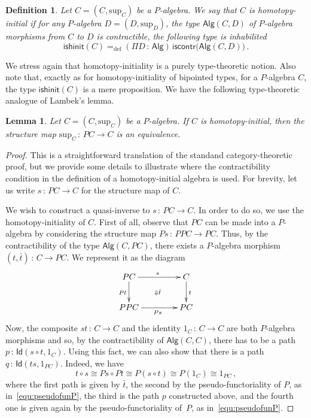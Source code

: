 \documentclass[10pt,a4paper,oneside,reqno]{amsart}
\numberwithin{equation}{section}
\theoremstyle{mythm}
\newtheorem{lemma}[theorem]{Lemma}
\theoremstyle{mydef}
\newtheorem{definition}[theorem]{Definition}
\theoremstyle{myrmk}
\newcommand{\ie}{\text{i.e.\ }}
\newcommand{\defeq}{=_{\mathrm{def}}}
\newcommand{\co}{\,{:}\,}
\newcommand{\iso}{\cong}
\newcommand{\iscontr}{\mathsf{iscontr}}
\newcommand{\isalghinit}{\mathsf{ishinit}}
\newcommand{\Id}{\mathsf{Id}}
\newcommand{\Palg}{\mathsf{Alg}}
\renewcommand{\sup}{\mathrm{sup}}
\begin{document}
\begin{definition}\label{def:AlgInit}
Let $C = (C, \sup_C)$ be a $P$-algebra. We say that $C$ is  \emph{homotopy-initial}  if for any $P$-algebra 
$D = (D, \sup_D)$, the type $\Palg(C,D)$ of $P$-algebra morphisms from $C$ to $D$
is contractible, \ie the following type is inhabilited
\[
\isalghinit(C) \defeq
 (\Pi D \co \Palg)  \, \iscontr \big( \Palg(C,D) \big)  \, .
\]  
\end{definition}

We stress again that homotopy-initiality is a purely type-theoretic notion. Also note that, exactly as for 
homotopy-initiality of bipointed types, for a $P$-algebra $C$, the type
$\isalghinit(C)$ is a mere proposition. 
We have the following type-theoretic analogue of Lambek's lemma.


\begin{lemma}\label{lem:IntLambek} Let $C = (C, \sup_C)$ be a $P$-algebra. 
If $C$ is homotopy-initial, then the structure map $\sup_C \co PC \to C$ is an equivalence.
\end{lemma}


\begin{proof} This is a straightforward translation of the standand category-theoretic proof, but we provide
some details to illustrate where the contractibility condition in the definition of a homotopy-initial algebra is
used. For brevity, let us write $s \co PC \to C$ for the structure map of $C$. 

 We wish to construct a quasi-inverse to $s \co PC \to C$. In order to do so, we use the homotopy-initiality
of $C$. First of all, observe that $PC$ can be made into a $P$-algebra by considering the structure map 
$Ps \co PPC \to PC$. Thus, by the contractibility of the type $\Palg(C, PC)$, there exists a $P$-algebra
morphism $(t, \bar{t}) \co C \to PC$. We represent it as the diagram
\begin{equation*}
\xymatrix@C=1.5cm{
PC \ar[d]_{Pt} \ar[r]^{s} \ar@{}[dr]|{\Downarrow \bar{t}}& C \ar[d]^{t} \\
PPC \ar[r]_{Ps} & PC}
\end{equation*}
Now, the composite $s  t \co C \to C$ and the identity $1_C \co C \to C$ are both $P$-algebra
morphisms and so, by the contractibility of $\Palg(C,C)$, there has to be a path $p \co \Id(s\circ t ,1_C)$. 
Using this fact, we can also show that there is a path $q \co \Id(t  s, 1_{PC})$. Indeed, we have
\[
t \circ s  \iso Ps \circ Pt 
 \iso P(s \circ t) 
 \iso P(1_C) 
  \iso 1_{PC} \, ,
\]
where the first path is given by $\bar{t}$, the second by the pseudo-functoriality of $P$, as in~\eqref{equ:pseudofunP},
the third is the path $p$ constructed above, and the fourth one is given again by the pseudo-functoriality of~$P$,
as in~\eqref{equ:pseudofunP}.
\end{proof}
\end{document}
